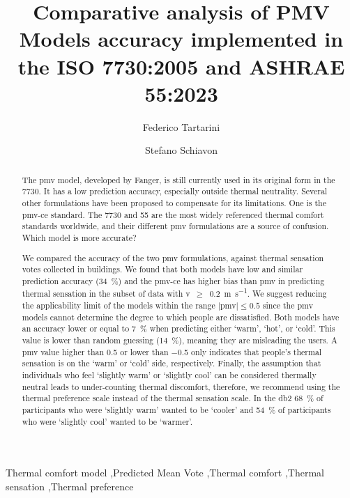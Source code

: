 \begin{frontmatter}

    \title{Comparative analysis of PMV Models accuracy implemented in the ISO 7730:2005 and ASHRAE 55:2023}

    \author[label1]{Federico Tartarini}
    \author[label3]{Stefano Schiavon}

    \address[label1]{The University of Sydney, Sydney, AU}
    \address[label3]{Center for the Built Environment, University of California, Berkeley, CA, USA}


    \begin{abstract}
        The \ac{pmv} model, developed by Fanger, is still currently used in its original form in the \gls{7730}.
        It has a low prediction accuracy, especially outside thermal neutrality.
        Several other formulations have been proposed to compensate for its limitations. 
        One is the \ac{pmv-ce} standard.
        The \gls{7730} and \gls{55} are the most widely referenced thermal comfort standards worldwide, and their different \ac{pmv} formulations are a source of confusion.
        Which model is more accurate?

        We compared the accuracy of the two \ac{pmv} formulations, against  thermal sensation votes collected in buildings.
        We found that both models have low and similar prediction accuracy (\qty{34}{\percent}) and the \ac{pmv-ce} has higher bias than \ac{pmv} in predicting thermal sensation in the subset of data with \ac{v}~$\geq$~\qty{0.2}{\m\per\s}.
        We suggest reducing the applicability limit of the models within the range $\mid$\ac{pmv}$\mid \leq 0.5$ since the \ac{pmv} models cannot determine the degree to which people are dissatisfied.
        Both models have an accuracy lower or equal to \qty{7}{\percent} when predicting either `warm', `hot', or `cold'.
        This value is lower than random guessing (\qty{14}{\percent}), meaning they are misleading the users.
        A \ac{pmv} value higher than \num{.5} or lower than \num{-.5} only indicates that people's thermal sensation is on the `warm' or `cold' side, respectively.
        Finally, the assumption that individuals who feel `slightly warm' or `slightly cool' can be considered thermally neutral leads to under-counting thermal discomfort, therefore, we recommend using the thermal preference scale instead of the thermal sensation scale.
        In the \ac{db2} \qty{68}{\percent} of participants who were `slightly warm' wanted to be `cooler' and \qty{54}{\percent} of participants who were `slightly cool' wanted to be `warmer'.
    \end{abstract}

    \begin{keyword}
        Thermal comfort model \sep Predicted Mean Vote \sep Thermal comfort \sep Thermal sensation \sep Thermal preference
    \end{keyword}

\end{frontmatter}
